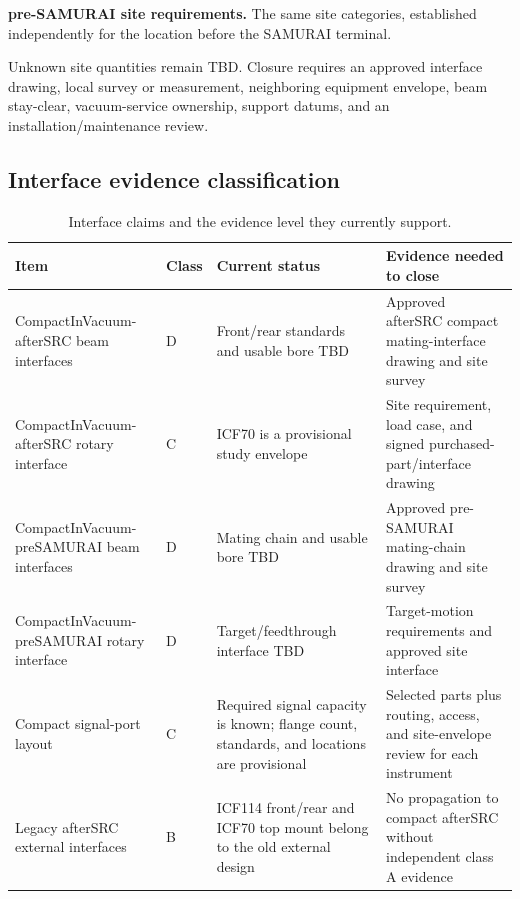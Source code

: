 \documentclass[10pt,letterpaper]{article}
\begin{document}
\textbf{pre-SAMURAI site requirements.}
The same site categories, established independently for the location before the SAMURAI
terminal.

Unknown site quantities remain TBD. Closure requires an approved interface drawing,
local survey or measurement, neighboring equipment envelope, beam stay-clear, vacuum-service
ownership, support datums, and an installation/maintenance review.

\subsection{Interface evidence classification}

\begin{table}[htbp]
  \centering
  \small
  \caption{Interface claims and the evidence level they currently support.}
  \begin{tabularx}{\textwidth}{L{0.22\textwidth}C{0.10\textwidth}Y Y}
    \toprule
    Item & Class & Current status & Evidence needed to close \\
    \midrule
    CompactInVacuum-afterSRC beam interfaces & D & Front/rear standards and usable bore TBD &
      Approved afterSRC compact mating-interface drawing and site survey \\
    CompactInVacuum-afterSRC rotary interface & C & ICF70 is a provisional study envelope &
      Site requirement, load case, and signed purchased-part/interface drawing \\
    CompactInVacuum-preSAMURAI beam interfaces & D & Mating chain and usable bore TBD &
      Approved pre-SAMURAI mating-chain drawing and site survey \\
    CompactInVacuum-preSAMURAI rotary interface & D & Target/feedthrough interface TBD &
      Target-motion requirements and approved site interface \\
    Compact signal-port layout & C & Required signal capacity is known; flange count,
      standards, and locations are provisional & Selected parts plus routing, access, and
      site-envelope review for each instrument \\
    Legacy afterSRC external interfaces & B & ICF114 front/rear and ICF70 top mount belong
      to the old external design & No propagation to compact afterSRC without independent
      class A evidence \\
    \bottomrule
  \end{tabularx}
\end{table}
\end{document}
